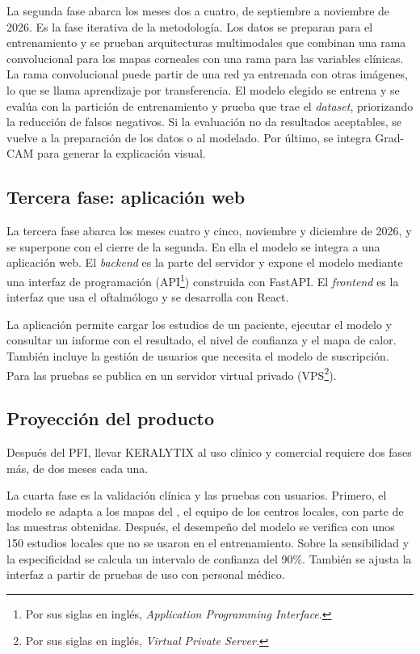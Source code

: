         La segunda fase abarca los meses dos a cuatro, de septiembre a noviembre de 2026. Es la fase iterativa de la metodología. Los datos se preparan para el entrenamiento y se prueban arquitecturas multimodales que combinan una rama convolucional para los mapas corneales con una rama para las variables clínicas. La rama convolucional puede partir de una red ya entrenada con otras imágenes, lo que se llama aprendizaje por transferencia. El modelo elegido se entrena y se evalúa con la partición de entrenamiento y prueba que trae el \textit{dataset}, priorizando la reducción de falsos negativos. Si la evaluación no da resultados aceptables, se vuelve a la preparación de los datos o al modelado. Por último, se integra Grad-CAM para generar la explicación visual.

    \subsection*{Tercera fase: aplicación web}

        La tercera fase abarca los meses cuatro y cinco, noviembre y diciembre de 2026, y se superpone con el cierre de la segunda. En ella el modelo se integra a una aplicación web. El \textit{backend} es la parte del servidor y expone el modelo mediante una interfaz de programación (API\footnote{Por sus siglas en inglés, \textit{Application Programming Interface}.}) construida con FastAPI. El \textit{frontend} es la interfaz que usa el oftalmólogo y se desarrolla con React.

        La aplicación permite cargar los estudios de un paciente, ejecutar el modelo y consultar un informe con el resultado, el nivel de confianza y el mapa de calor. También incluye la gestión de usuarios que necesita el modelo de suscripción. Para las pruebas se publica en un servidor virtual privado (VPS\footnote{Por sus siglas en inglés, \textit{Virtual Private Server}.}).

    \subsection*{Proyección del producto}

        Después del PFI, llevar KERALYTIX al uso clínico y comercial requiere dos fases más, de dos meses cada una.

        La cuarta fase es la validación clínica y las pruebas con usuarios. Primero, el modelo se adapta a los mapas del \Pentacam{}, el equipo de los centros locales, con parte de las muestras obtenidas. Después, el desempeño del modelo se verifica con unos 150 estudios locales que no se usaron en el entrenamiento. Sobre la sensibilidad y la especificidad se calcula un intervalo de confianza del 90\%. También se ajusta la interfaz a partir de pruebas de uso con personal médico.

